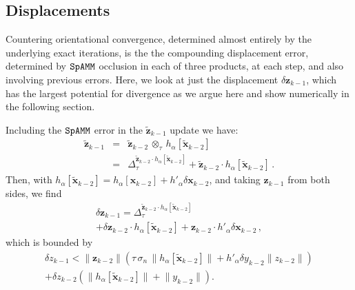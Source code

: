\documentclass[letterpaper,twocolumn,amsmath,amsfont,amssymb,english,aps,jcp,preprintnumbers,groupaddress,nofootinbib,tightenlines,floatfix]{revtex4}
\newcommand{\mat}[1]{\boldsymbol{#1}}
\newcommand{\ot}{  {\scriptstyle \otimes}_{ \tau } }
\theoremstyle{plain}
\theoremstyle{remark}
\theoremstyle{plain}
\begin{document}
\subsection{Displacements}
Countering orientational convergence,  determined almost entirely by the underlying exact iterations, is the 
the compounding displacement error, determined by $\tt SpAMM$ occlusion in each of three products, at each step, and also
involving previous errors.  Here, we look at just the displacement $\delta \mat{z}_{k-1}$,
which has the largest potential for divergence as we argue here and show numerically in the following section. 

Including the $\tt SpAMM$ error in the $\widetilde{\mat{z}}_{k-1}$ update we have:
\begin{eqnarray} \label{widetildez}
 \widetilde{\mat{z}}_{k-1} &=&  \widetilde{\mat{z}}_{k-2}  \, \ot \, h_\alpha[\widetilde{\mat{x}}_{k-2}]\\ \nonumber
&=& \Delta^{\widetilde{\mat{z}}_{k-2} \cdot h_\alpha \left[ \widetilde{\mat{x}}_{k-2}\right]}_\tau
+ \widetilde{\mat{z}}_{k-2} \cdot h_\alpha\left[ \widetilde{\mat{x}}_{k-2}\right] \, .
\end{eqnarray}
Then, with $ h_\alpha \left[ \widetilde{\mat{x}}_{k-2} \right]
=  h_\alpha \left[ \mat{x}_{k-2} \right] +  h'_\alpha  \delta \mat{x}_{k-2}$, and taking $\mat{z}_{k-1}$ from both sides, we find  
\begin{multline}
 \delta {\mat{z}}_{k-1} =\Delta^{\widetilde{\mat{z}}_{k-2} \cdot h_\alpha \left[ \widetilde{\mat{x}}_{k-2}\right]}_\tau
\\ +\delta \mat{z}_{k-2} \cdot h_\alpha \left[\widetilde{\mat{x}}_{k-2} \right]
+ \mat{z}_{k-2} \cdot h'_\alpha \delta \mat{x}_{k-2}  \, ,
\end{multline}
which is bounded by 
 \begin{multline}\label{zdispalcementbound}
  \delta {z}_{k-1} <
 \lVert \mat{z}_{k-2} \rVert \left( \tau  \, \sigma_n  \, \lVert h_\alpha \left[\widetilde{\mat{x}}_{k-2} \right]  \rVert
 + h'_\alpha  \delta y_{k-2} \lVert z_{k-2} \rVert \right)  \\ 
 + \delta {z}_{k-2} \left( \lVert h_\alpha \left[\widetilde{\mat{x}}_{k-2}  \right] \rVert  + \lVert y_{k-2} \rVert \right) .
 \end{multline}
\end{document}
